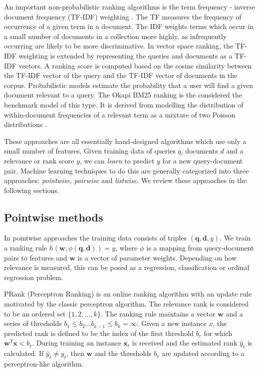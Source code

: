 \documentclass[english]{article}
\theoremstyle{definition}
\begin{document}
\begin{multicols}{2}
An important non-probabilistic ranking algorithms is the term frequency - inverse document frequency (TF-IDF) weighting \cite{tfidf}.  The TF measures the frequency of occurrence of a given term in a document.  The IDF weights terms which occur in a small number of documents in a collection more highly, as infrequently occurring are likely to be more discriminative.  In vector space ranking, the TF-IDF weighting is extended by representing the queries and documents as a TF-IDF vectors.   A ranking score is computed based on the cosine similarity between the TF-IDF vector of the query and the TF-IDF vector of documents in the corpus.  Probabilistic models estimate the probability that a user will find a given document relevant to a query.  The Okapi BM25 ranking is the considered the benchmark model of this type.  It is derived from modelling the distribution of within-document frequencies of a relevant
term as a mixture of two Poisson distributions \cite{robertson1993okapi}.

These approaches are all essentially hand-designed algorithms which use only a small number of features.  Given training data of queries $q$, documents $d$ and a relevance or rank score $y$, we can \textit{learn} to predict $y$ for a new query-document pair.  Machine learning techniques to do this are generally categorized into three approaches: \textit{pointwise}, \textit{pairwise} and \textit{listwise}.  We review these approaches in the following sections.

\subsection{Pointwise methods}

In pointwise approaches the training data consists of triples $(\mathbf{q}, \mathbf{d}, y)$.  We train a ranking rule $h(\mathbf{w}, \phi (\mathbf{q}, \mathbf{d})) = y$, where $\phi$ is a mapping from query-document pairs to features and $\mathbf{w}$ is a vector of parameter weights.  Depending on how relevance is measured, this can be posed as a regression, classification or ordinal regression problem.

PRank \cite{crammer2001pranking} (Perceptron Ranking) is an online ranking algorithm with an update rule motivated by the classic perceptron algorithm.  The relevance rank is considered to be an ordered set $\{1, 2, \ldots, k \}$.  The ranking rule maintains a vector $\mathbf{w}$ and a series of thresholds $b_1 \le b_2 \ldots b_{k-1} \le b_k = \infty$.  Given a new instance $x$, the predicted rank is defined to be the index of the first threshold $b_r$ for which $\mathbf{w}^T \mathbf{x} < b_r$.  During training an instance $\mathbf{x}_t$ is received and the estimated rank $\hat{y}_t$ is calculated.  If $\hat{y}_t \ne y_t$, then $\mathbf{w}$ and the thresholds $b_r$ are updated according to a perceptron-like algorithm.


\end{multicols}
\end{document}
